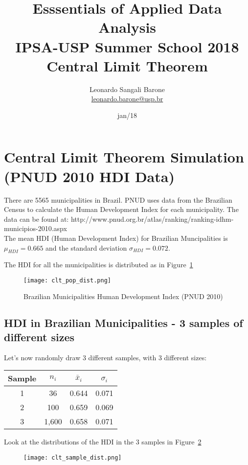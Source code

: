 \documentclass[11pt]{article}
\title{\textbf{Esssentials of Applied Data Analysis\\
				IPSA-USP Summer School 2018}\newline\\
				Central Limit Theorem}
\author{Leonardo Sangali Barone\\ \href{leonardo.barone@usp.br}{leonardo.barone@usp.br}}
\date{jan/18}
\begin{document}
\maketitle

\section*{Central Limit Theorem Simulation (PNUD 2010 HDI Data)}

There are 5565 municipalities in Brazil. PNUD uses data from the Brazilian Census to calculate the Human Development Index for each municipality. The data can be found at: http://www.pnud.org.br/atlas/ranking/ranking-idhm-municipios-2010.aspx\\

The mean HDI (Human Development Index) for Brazilian Muncipalities is $\mu_{HDI}=0.665$ and the standard deviation $\sigma_{HDI} = 0.072$.

	The HDI for all the municipalities is distributed as in Figure~\ref{f1}

\begin{figure}[htp]
\centering
\texttt{[image: clt\_pop\_dist.png]}
\caption{Brazilian Municipalities Human Development Index (PNUD 2010)}
\label{f1}
\end{figure}

\subsection*{HDI in Brazilian Municipalities - 3 samples of different sizes}
	Let's now randomly draw 3 different samples, with 3 different sizes:\\

\begin{tabular}{|c|c|c|c|}
\hline
	Sample & $n_i$ & $\bar{x}_i$ & $\hat{\sigma}_i$\\
\hline
	1 & 36 & 0.644 & 0.071\\
	2 & 100 & 0.659 & 0.069\\
	3 & 1,600 & 0.658 & 0.071\\
\hline
\end{tabular}

Look at the distributions of the HDI in the 3 samples in Figure~\ref{f2}

\begin{figure}[htp]
\centering
\texttt{[image: clt\_sample\_dist.png]}
\caption{}
\label{f2}
\end{figure}
\end{document}
